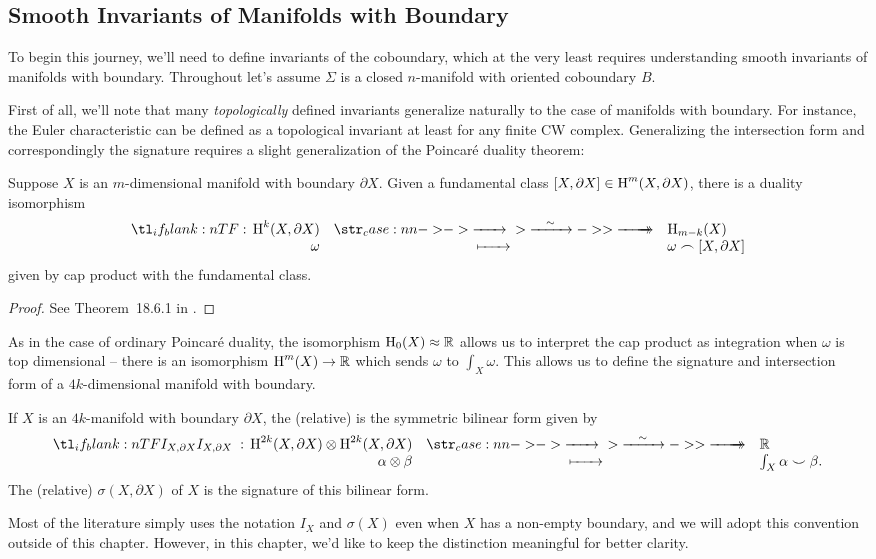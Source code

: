 \subsection*{Smooth Invariants of Manifolds with Boundary}

To begin this journey, we'll need to define invariants of the coboundary, which at the very least requires understanding
smooth invariants of manifolds with boundary.
Throughout let's assume $\Sigma$ is a closed $n$-manifold with oriented coboundary $B$.

First of all, we'll note that many \emph{topologically} defined invariants generalize naturally to the case of manifolds with boundary. For instance, the Euler characteristic can be defined as a topological invariant at least for any finite CW complex. Generalizing the intersection form and correspondingly the signature requires a slight generalization of the Poincar\'e duality theorem:
\begin{theorem}
	Suppose $X$ is an $m$-dimensional manifold with boundary $\partial X$. Given a fundamental class $[X, \partial X]\in \operatorname{H}^{m}(X, \partial X)$, there is a duality isomorphism
	\[
		\lkxfunc{}{\H^k(X, \partial X)}{\H_{m-k}(X)}{\omega}{\omega\frown [X,\partial X]}
	\]
	given by cap product with the fundamental class.
\end{theorem}
\begin{proof}
	See Theorem~18.6.1 in \cite{dieck2008algebraic}.
\end{proof}
As in the case of ordinary Poincar\'e duality, the isomorphism $\operatorname{H}_0(X)\approx \mathbb{R}$ allows us to interpret the cap product as integration when $\omega$ is top dimensional -- there is an isomorphism $\operatorname{H}^m(X)\to \mathbb{R}$ which sends $\omega$ to $\int_X \omega$. This allows us to define the signature and intersection form of a $4k$-dimensional manifold with boundary.

\begin{definition}
	If $X$ is an $4k$-manifold with boundary $\partial X$, the (relative)  is the symmetric bilinear form given by
	\[
		\lkxfunc{I_{X,\partial X}}{\H^{2k}(X, \partial X)\otimes \H^{2k}(X, \partial X)}
		{\R}{\alpha\otimes \beta}{\int_X \alpha\smile \beta.}
	\]
	The (relative)  $\sigma(X, \partial X)$ of $X$ is the signature of this bilinear form.
\end{definition}

\begin{convention*}
	Most of the literature simply uses the notation $I_X$ and $\sigma(X)$ even when $X$ has a non-empty boundary, and we will adopt this convention outside of this chapter. However, in this chapter, we'd like to keep the distinction meaningful for better clarity.
\end{convention*}

